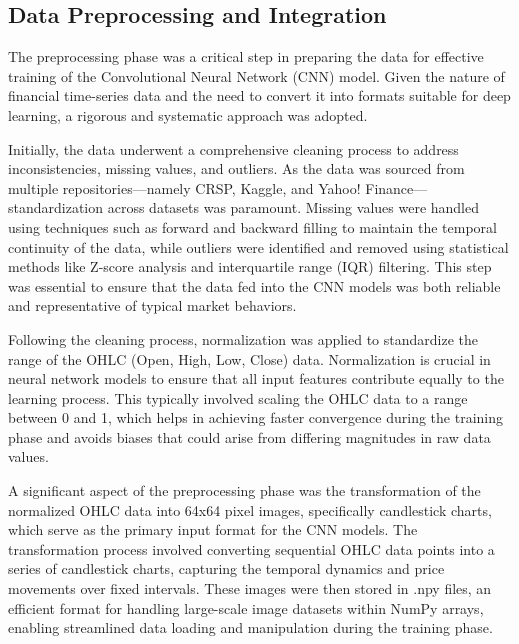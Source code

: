 \thesisspacing %

\subsection{Data Preprocessing and Integration}

The preprocessing phase was a critical step in preparing the data for effective training of the Convolutional Neural Network (CNN) model. Given the nature of financial time-series data and the need to convert it into formats suitable for deep learning, a rigorous and systematic approach was adopted.

Initially, the data underwent a comprehensive cleaning process to address inconsistencies, missing values, and outliers. As the data was sourced from multiple repositories—namely CRSP, Kaggle, and Yahoo! Finance—standardization across datasets was paramount. Missing values were handled using techniques such as forward and backward filling to maintain the temporal continuity of the data, while outliers were identified and removed using statistical methods like Z-score analysis and interquartile range (IQR) filtering. This step was essential to ensure that the data fed into the CNN models was both reliable and representative of typical market behaviors.

Following the cleaning process, normalization was applied to standardize the range of the OHLC (Open, High, Low, Close) data. Normalization is crucial in neural network models to ensure that all input features contribute equally to the learning process. This typically involved scaling the OHLC data to a range between 0 and 1, which helps in achieving faster convergence during the training phase and avoids biases that could arise from differing magnitudes in raw data values.

A significant aspect of the preprocessing phase was the transformation of the normalized OHLC data into 64x64 pixel images, specifically candlestick charts, which serve as the primary input format for the CNN models. The transformation process involved converting sequential OHLC data points into a series of candlestick charts, capturing the temporal dynamics and price movements over fixed intervals. These images were then stored in .npy files, an efficient format for handling large-scale image datasets within NumPy arrays, enabling streamlined data loading and manipulation during the training phase.

